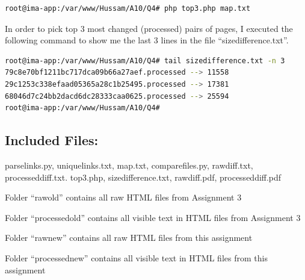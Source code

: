 \documentclass[a4paper, 11pt]{article}
\begin{document}


\begin{lstlisting}[language=bash, breakatwhitespace=〈false), label=running top3.php, caption= Running top3.php to sort the processed files based on the difference in size]
root@ima-app:/var/www/Hussam/A10/Q4# php top3.php map.txt
\end{lstlisting}

In order to pick top 3 most changed (processed) pairs of pages, I executed the following command to show me the last 3 lines in the file ``sizedifference.txt''.

\begin{lstlisting}[language=bash, breakatwhitespace=〈false), label=Using tail on sizedifference.txt, caption= Using tail on sizedifference.txt to pick top 3 most changed (processed) pairs of pages.]
root@ima-app:/var/www/Hussam/A10/Q4# tail sizedifference.txt -n 3
79c8e70bf1211bc717dca09b66a27aef.processed --> 11558
29c1253c338efaad05365a28c1b25495.processed --> 17381
68046d7c24bb2dacd6dc28333caa0625.processed --> 25594
root@ima-app:/var/www/Hussam/A10/Q4#
\end{lstlisting}


\subsection*{Included Files:}
parselinks.py, uniquelinks.txt, map.txt, comparefiles.py, rawdiff.txt, processeddiff.txt. top3.php, sizedifference.txt, rawdiff.pdf, processeddiff.pdf

\noindent
Folder ``rawold'' contains all raw HTML files from Assignment 3
 
\noindent
Folder ``processedold'' contains all visible text in HTML files from Assignment 3

\noindent
Folder ``rawnew'' contains all raw HTML files from this assignment
 
\noindent
Folder ``processednew'' contains all visible text in HTML files from this assignment
\end{document}
